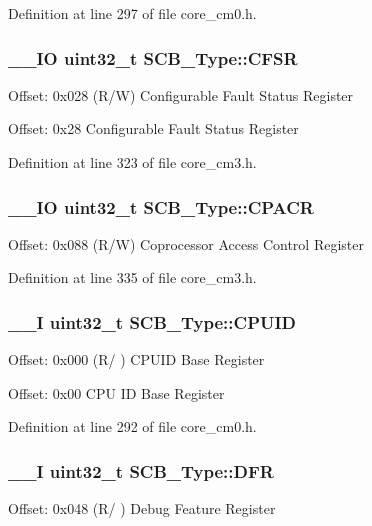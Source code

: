 Definition at line 297 of file core\-\_\-cm0.\-h.

\hypertarget{struct_s_c_b___type_a2f94bf549b16fdeb172352e22309e3c4}{
\subsubsection[{C\-F\-S\-R}]{\setlength{\rightskip}{0pt plus 5cm}\-\_\-\-\_\-\-I\-O {\bf uint32\-\_\-t} S\-C\-B\-\_\-\-Type\-::\-C\-F\-S\-R}}\label{struct_s_c_b___type_a2f94bf549b16fdeb172352e22309e3c4}
Offset\-: 0x028 (R/\-W) Configurable Fault Status Register

Offset\-: 0x28 Configurable Fault Status Register 

Definition at line 323 of file core\-\_\-cm3.\-h.

\hypertarget{struct_s_c_b___type_af460b56ce524a8e3534173f0aee78e85}{
\subsubsection[{C\-P\-A\-C\-R}]{\setlength{\rightskip}{0pt plus 5cm}\-\_\-\-\_\-\-I\-O {\bf uint32\-\_\-t} S\-C\-B\-\_\-\-Type\-::\-C\-P\-A\-C\-R}}\label{struct_s_c_b___type_af460b56ce524a8e3534173f0aee78e85}
Offset\-: 0x088 (R/\-W) Coprocessor Access Control Register 

Definition at line 335 of file core\-\_\-cm3.\-h.

\hypertarget{struct_s_c_b___type_afa7a9ee34dfa1da0b60b4525da285032}{
\subsubsection[{C\-P\-U\-I\-D}]{\setlength{\rightskip}{0pt plus 5cm}\-\_\-\-\_\-\-I {\bf uint32\-\_\-t} S\-C\-B\-\_\-\-Type\-::\-C\-P\-U\-I\-D}}\label{struct_s_c_b___type_afa7a9ee34dfa1da0b60b4525da285032}
Offset\-: 0x000 (R/ ) C\-P\-U\-I\-D Base Register

Offset\-: 0x00 C\-P\-U I\-D Base Register 

Definition at line 292 of file core\-\_\-cm0.\-h.

\hypertarget{struct_s_c_b___type_a586a5225467262b378c0f231ccc77f86}{
\subsubsection[{D\-F\-R}]{\setlength{\rightskip}{0pt plus 5cm}\-\_\-\-\_\-\-I {\bf uint32\-\_\-t} S\-C\-B\-\_\-\-Type\-::\-D\-F\-R}}\label{struct_s_c_b___type_a586a5225467262b378c0f231ccc77f86}
Offset\-: 0x048 (R/ ) Debug Feature Register

